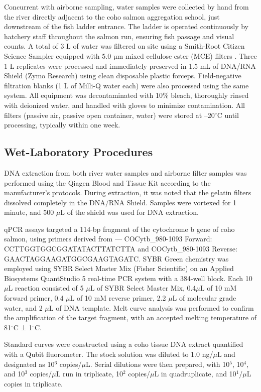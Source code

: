 \documentclass{article}
\begin{document}
Concurrent with airborne sampling, water samples were collected by hand from the river directly adjacent to the coho salmon aggregation school, just downstream of the fish ladder entrance. The ladder is operated continuously by hatchery staff throughout the salmon run, ensuring fish passage and visual counts. A total of 3 L of water was filtered on site using a Smith-Root Citizen Science Sampler equipped with 5.0 µm mixed cellulose ester (MCE) filters \cite{allan2023}. Three 1 L replicates were processed and immediately preserved in 1.5 mL of DNA/RNA Shield (Zymo Research) using clean disposable plastic forceps. Field-negative filtration blanks (1 L of Milli-Q water each) were also processed using the same system. All equipment was decontaminated with 10\% bleach, thoroughly rinsed with deionized water, and handled with gloves to minimize contamination. All filters (passive air, passive open container, water) were stored at –20$^\circ$C until processing, typically within one week.


\subsection{Wet-Laboratory Procedures}
DNA extraction from both river water samples and airborne filter samples was performed using the Qiagen Blood and Tissue Kit according to the manufacturer’s protocols. During extraction, it was noted that the gelatin filters dissolved completely in the DNA/RNA Shield. Samples were vortexed for 1 minute, and 500 $\mu$L of the shield was used for DNA extraction.

qPCR assays targeted a 114-bp fragment of the cytochrome b gene of coho salmon, using primers derived from \cite{duda2021}— COCytb\_980-1093 Forward: CCTTGGTGGCGGATATACTTATCTTA and COCytb\_980-1093 Reverse: GAACTAGGAAGATGGCGAAGTAGATC. SYBR Green chemistry was employed using SYBR Select Master Mix (Fisher Scientific) on an Applied Biosystems QuantStudio 5 real-time PCR system with a 384-well block. Each 10 $\mu$L reaction consisted of 5 $\mu$L of SYBR Select Master Mix, 0.4$\mu$L of 10 mM forward primer, 0.4 $\mu$L of 10 mM reverse primer, 2.2 $\mu$L of molecular grade water, and 2 $\mu$L of DNA template. Melt curve analysis was performed to confirm the amplification of the target fragment, with an accepted melting temperature of 81$^\circ$C ± 1$^\circ$C.

Standard curves were constructed using a coho tissue DNA extract quantified with a Qubit fluorometer. The stock solution was diluted to 1.0 ng/$\mu$L and designated as 10$^6$ copies/$\mu$L. Serial dilutions were then prepared, with 10$^5$, 10$^4$, and 10$^3$ copies/$\mu$L run in triplicate, 10$^2$ copies/$\mu$L in quadruplicate, and 10$^1$/$\mu$L copies in triplicate.
\end{document}
